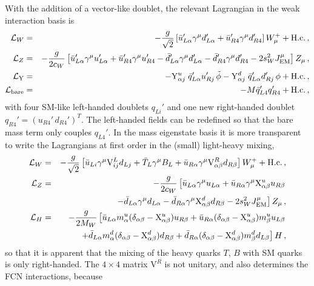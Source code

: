 \documentclass[12pt,a4paper]{article}
\newcommand{\gm}{\gamma^\mu}
\newcommand{\Wmp}{W_\mu^+}
\newcommand{\Zm}{Z_\mu}
\begin{document}
With the addition of a vector-like doublet, the relevant Lagrangian in the weak interaction basis is
\begin{eqnarray}
\mathcal{L}_W & = & -\frac{g}{\sqrt 2} \left[
\bar u_{L\alpha}' \gm d_{L\alpha}' + \bar u_{R4}' \gm d_{R4}' \right] \Wmp
 + \text{H.c.} \,, \notag \\
%
\mathcal{L}_Z & = & -\frac{g}{2 c_W} \left[ \bar u_{L\alpha}' \gm u_{L\alpha}' + 
 \bar u_{R4}' \gm u_{R4}' - \bar d_{L\alpha}' \gm d_{L\alpha}' 
 - \bar d_{R4}' \gm d_{R4}' - 2 s_W^2 J_\text{EM}^\mu \right] \Zm \,, \notag \\
%
\mathcal{L}_\text{Y} & = &
  - \mathrm{Y}_{\alpha j}^u \; \bar q_{L\alpha}' u_{Rj}' \, \tilde \phi
  - \mathrm{Y}_{\alpha j}^d \; \bar q_{L\alpha}' d_{Rj}' \, \phi
+ \text{H.c.} \,, \notag \\
\mathcal{L}_\text{bare}  & = & - M \bar q_{L4}' q_{R4}' + \text{H.c.} \,,
\end{eqnarray}
with four SM-like left-handed doublets $q_{Li}'$ and one new right-handed doublet
$q_{R4}' = (u_{R4}' \, d_{R4}')^T$. The left-handed fields can be redefined so that the bare mass term only couples $q_{L4}'$.
In the mass eigenstate basis it is more transparent to write the Lagrangians at first order in the (small) light-heavy mixing,
\begin{eqnarray}
\mathcal{L}_W & = & -\frac{g}{\sqrt 2} \left[
  \bar u_{Li} \gm \mathrm{V}_{ij}^L d_{Lj} + \bar T_L \gm B_L 
+ \bar u_{R\alpha} \gm \mathrm{V}_{\alpha \beta}^R d_{R\beta}
 \right] \Wmp + \text{H.c.} \,, \notag \\
%
\mathcal{L}_Z & = & -\frac{g}{2 c_W} \left[
\bar u_{L\alpha} \gm u_{L\alpha}
+ \bar u_{R\alpha} \gm \mathrm{X}_{\alpha \beta}^u u_{R\beta} \right. \notag \\
& & \left. - \bar d_{L\alpha} \gm d_{L\alpha}
- \bar d_{R\alpha} \gm \mathrm{X}_{\alpha \beta}^d d_{R\beta}
- 2 s_W^2 J_\text{EM}^\mu \right] \Zm \,, \notag \\
%
\mathcal{L}_H & = & - \frac{g}{2 M_W} \left[
\bar u_{L\alpha} m_\alpha^u (\delta_{\alpha \beta}-\mathrm{X}^u_{\alpha \beta}) u_{R\beta}
+ \bar u_{R\alpha} (\delta_{\alpha \beta}-\mathrm{X}^u_{\alpha \beta}) m_\beta^u u_{L\beta}
\right. \notag \\
& & \left. 
+ \bar d_{L\alpha} m_\alpha^d (\delta_{\alpha \beta}-\mathrm{X}^d_{\alpha \beta}) d_{R\beta}
+ \bar d_{R\alpha} (\delta_{\alpha \beta}-\mathrm{X}^d_{\alpha \beta}) m_\beta^d d_{L\beta}
\right] H \,,
\end{eqnarray}
so that it is apparent that the mixing of the heavy quarks $T$, $B$ with SM quarks is only right-handed. The $4 \times 4$ matrix $\mathrm{V}^R$ is not unitary, and also determines the FCN interactions, because
\end{document}
